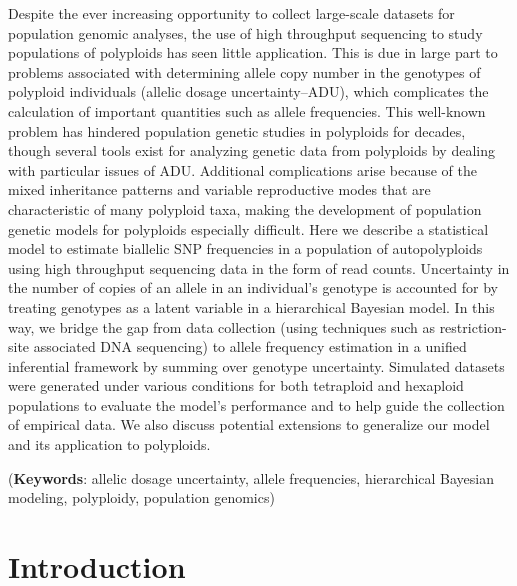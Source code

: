 \documentclass[11pt,english,letterpaper,oneside]{article}
\begin{document}
Despite the ever increasing opportunity to collect large-scale datasets for population genomic analyses, the use of high throughput sequencing to study populations of polyploids has seen little application. This is due in large part to problems associated with determining allele copy number in the genotypes of polyploid individuals (allelic dosage uncertainty--ADU), which complicates the calculation of important quantities such as allele frequencies. This well-known problem has hindered population genetic studies in polyploids for decades, though several tools exist for analyzing genetic data from polyploids by dealing with particular issues of ADU. Additional complications arise because of the mixed inheritance patterns and variable reproductive modes that are characteristic of many polyploid taxa, making the development of population genetic models for polyploids especially difficult. Here we describe a statistical model to estimate biallelic SNP frequencies in a population of autopolyploids using high throughput sequencing data in the form of read counts. Uncertainty in the number of copies of an allele in an individual's genotype is accounted for by treating genotypes as a latent variable in a hierarchical Bayesian model. In this way, we bridge the gap from data collection (using techniques such as restriction-site associated DNA sequencing) to allele frequency estimation in a unified inferential framework by summing over genotype uncertainty. Simulated datasets were generated under various conditions for both tetraploid and hexaploid populations to evaluate the model's performance and to help guide the collection of empirical data. We also discuss potential extensions to generalize our model and its application to polyploids.
\vspace{0.25in}

\noindent (\textbf{Keywords}: allelic dosage uncertainty, allele frequencies, hierarchical Bayesian modeling, polyploidy, population genomics)
\vspace{0.25in}

\section*{Introduction}            %
\end{document}
